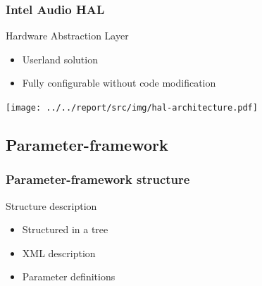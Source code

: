 \begin{frame}
    \frametitle{Intel Audio HAL}
    \begin{minipage}{0.40\textwidth}
        \begin{block}{Hardware Abstraction Layer}
            \begin{itemize}
                \item Userland solution
                \item Fully configurable without code modification
            \end{itemize}
        \end{block}
    \end{minipage}
    \begin{minipage}{0.50\textwidth}
        \flushright
        \texttt{[image: ../../report/src/img/hal-architecture.pdf]}
    \end{minipage}
\end{frame}


\subsection{Parameter-framework}
\begin{frame}
    \frametitle{Parameter-framework structure}
    \begin{minipage}{0.40\textwidth}
    \begin{block}{Structure description}
        \begin{itemize}
            \item Structured in a tree
            \item XML description
            \item Parameter definitions
        \end{itemize}
    \end{block}
    \end{minipage}
    \begin{minipage}{0.50\textwidth}
    \end{minipage}
\end{frame}

